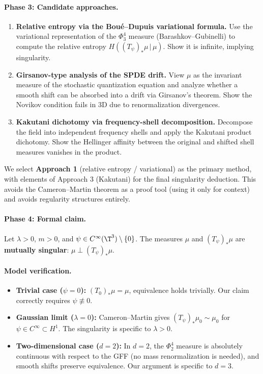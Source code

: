 \paragraph{Phase 3: Candidate approaches.}
\begin{enumerate}
\item \textbf{Relative entropy via the Bou\'e--Dupuis variational formula.}
  Use the variational representation of the $\Phi^4_3$ measure (Barashkov--Gubinelli)
  to compute the relative entropy $H((T_\psi)_*\mu \,|\, \mu)$. Show it is
  infinite, implying singularity.
\item \textbf{Girsanov-type analysis of the SPDE drift.}
  View $\mu$ as the invariant measure of the stochastic quantization equation
  and analyze whether a smooth shift can be absorbed into a drift via Girsanov's
  theorem. Show the Novikov condition fails in 3D due to renormalization
  divergences.
\item \textbf{Kakutani dichotomy via frequency-shell decomposition.}
  Decompose the field into independent frequency shells and apply the Kakutani
  product dichotomy. Show the Hellinger affinity between the original and shifted
  shell measures vanishes in the product.
\end{enumerate}

We select \textbf{Approach 1} (relative entropy / variational) as the primary
method, with elements of Approach 3 (Kakutani) for the final singularity
deduction. This avoids the Cameron--Martin theorem as a proof tool (using it
only for context) and avoids regularity structures entirely.

\paragraph{Phase 4: Formal claim.}

\begin{theorem}\label{thm:main-p1}
Let $\lambda > 0$, $m > 0$, and $\psi \in C^\infty(\T^3) \setminus \{0\}$.
The measures $\mu$ and $(T_\psi)_*\mu$ are \textbf{mutually singular}:
$\mu \perp (T_\psi)_*\mu$.
\end{theorem}

\paragraph{Model verification.}
\begin{itemize}
\item \textbf{Trivial case ($\psi = 0$):} $(T_0)_*\mu = \mu$, equivalence
  holds trivially. Our claim correctly requires $\psi \not\equiv 0$.
\item \textbf{Gaussian limit ($\lambda = 0$):} Cameron--Martin gives
  $(T_\psi)_*\mu_0 \sim \mu_0$ for $\psi \in C^\infty \subset H^1$. The
  singularity is specific to $\lambda > 0$.
\item \textbf{Two-dimensional case ($d=2$):} In $d=2$, the $\Phi^4_2$ measure
  is absolutely continuous with respect to the GFF (no mass renormalization is
  needed), and smooth shifts preserve equivalence. Our argument is specific to
  $d=3$.
\end{itemize}

